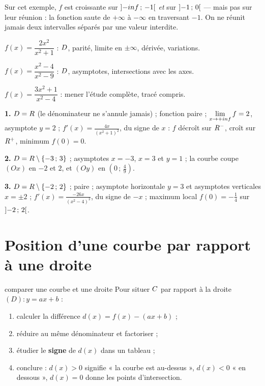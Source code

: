 \begin{avertissement}
Sur cet exemple, $f$ est croissante sur $\left]-inf\,;\,-1\right[$
\emph{et} sur $\left]-1\,;\,0\right[$ — mais pas sur leur réunion : la
fonction saute de $+\infty$ à $-\infty$ en traversant $-1$. On ne réunit
jamais deux intervalles séparés par une valeur interdite.
\end{avertissement}

\begin{entrainement}
\exo[\niveau{2}] $f(x) = \dfrac{2x^{2}}{x^{2}+1}$ : $D$, parité, limite en
$\pm\infty$, dérivée, variations.

\exo[\niveau{2}] $f(x) = \dfrac{x^{2}-4}{x^{2}-9}$ : $D$, asymptotes,
intersections avec les axes.

\exo[\niveau{3}] $f(x) = \dfrac{3x^{2}+1}{x^{2}-4}$ : mener l'étude
complète, tracé compris.
\end{entrainement}

\begin{corrige}
\textbf{1.} $D = R$ (le dénominateur ne s'annule jamais) ; fonction
paire ; $\limpinf f = 2$, asymptote $y = 2$ ;
$f'(x) = \frac{4x}{\left(x^{2}+1\right)^{2}}$, du signe de $x$ : $f$ décroît
sur $R^{-}$, croît sur $R^{+}$, minimum $f(0) = 0$.

\textbf{2.} $D = R\setminus\{-3\,;\,3\}$ ; asymptotes $x = -3$, $x = 3$ et
$y = 1$ ; la courbe coupe $(Ox)$ en $-2$ et $2$, et $(Oy)$ en
$\left(0\,;\,\frac49\right)$.

\textbf{3.} $D = R\setminus\{-2\,;\,2\}$ ; paire ; asymptote horizontale
$y = 3$ et asymptotes verticales $x = \pm2$ ;
$f'(x) = \frac{-26x}{\left(x^{2}-4\right)^{2}}$, du signe de $-x$ ; maximum
local $f(0) = -\frac14$ sur $\left]-2\,;\,2\right[$.
\end{corrige}

\section{Position d'une courbe par rapport à une droite}

\begin{methode}{comparer une courbe et une droite}
Pour situer $C$ par rapport à la droite $(D) : y = ax+b$ :
\begin{enumerate}[label=\textbf{\arabic*.}, leftmargin=*, itemsep=0.15em]
  \item calculer la différence $d(x) = f(x)-(ax+b)$ ;
  \item réduire au même dénominateur et factoriser ;
  \item étudier le \textbf{signe} de $d(x)$ dans un tableau ;
  \item conclure : $d(x) > 0$ signifie « la courbe est au-dessus »,
        $d(x) < 0$ « en dessous », $d(x) = 0$ donne les points
        d'intersection.
\end{enumerate}
\end{methode}

